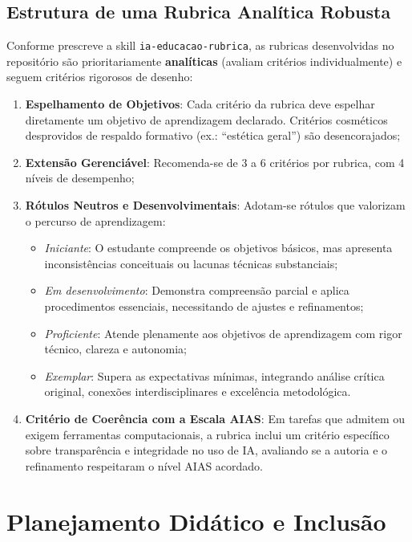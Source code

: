 \subsection{Estrutura de uma Rubrica Anal{\'i}tica Robusta}

Conforme prescreve a skill \texttt{ia-educacao-rubrica}, as rubricas desenvolvidas no reposit{\'o}rio s{\~a}o prioritariamente \textbf{anal{\'i}ticas} (avaliam crit{\'e}rios individualmente) e seguem crit{\'e}rios rigorosos de desenho:

\begin{enumerate}
  \item \textbf{Espelhamento de Objetivos}: Cada crit{\'e}rio da rubrica deve espelhar diretamente um objetivo de aprendizagem declarado. Crit{\'e}rios cosm{\'e}ticos desprovidos de respaldo formativo (ex.: ``est{\'e}tica geral'') s{\~a}o desencorajados;
  \item \textbf{Extens{\~a}o Gerenci{\'a}vel}: Recomenda-se de 3 a 6 crit{\'e}rios por rubrica, com 4 n{\'i}veis de desempenho;
  \item \textbf{R{\'o}tulos Neutros e Desenvolvimentais}: Adotam-se r{\'o}tulos que valorizam o percurso de aprendizagem:
    \begin{itemize}
      \item \emph{Iniciante}: O estudante compreende os objetivos b{\'a}sicos, mas apresenta inconsist{\^e}ncias conceituais ou lacunas t{\'e}cnicas substanciais;
      \item \emph{Em desenvolvimento}: Demonstra compreens{\~a}o parcial e aplica procedimentos essenciais, necessitando de ajustes e refinamentos;
      \item \emph{Proficiente}: Atende plenamente aos objetivos de aprendizagem com rigor t{\'e}cnico, clareza e autonomia;
      \item \emph{Exemplar}: Supera as expectativas m{\'i}nimas, integrando an{\'a}lise cr{\'i}tica original, conex{\~o}es interdisciplinares e excel{\^e}ncia metodol{\'o}gica.
    \end{itemize}
  \item \textbf{Crit{\'e}rio de Coer{\^e}ncia com a Escala AIAS}: Em tarefas que admitem ou exigem ferramentas computacionais, a rubrica inclui um crit{\'e}rio espec{\'i}fico sobre transpar{\^e}ncia e integridade no uso de IA, avaliando se a autoria e o refinamento respeitaram o n{\'i}vel AIAS acordado.
\end{enumerate}

\section{Planejamento Did{\'a}tico e Inclus{\~a}o}

